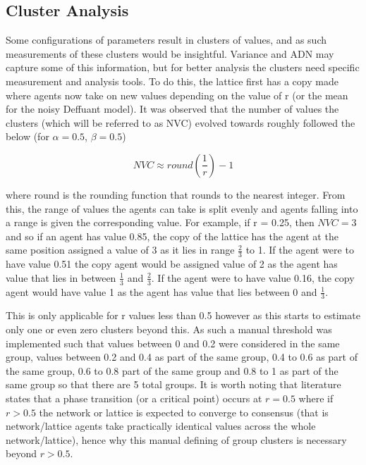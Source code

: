  \subsection{Cluster Analysis}
 Some configurations of parameters result in clusters of values, and as such measurements of these clusters would be insightful. Variance and ADN may capture some of this information, but for better analysis the clusters need specific measurement and analysis tools. To do this, the lattice first has a copy made where agents now take on new values depending on the value of r (or the mean for the noisy Deffuant model). It was observed that the number of values the clusters (which will be referred to as NVC) evolved towards roughly followed the below (for $\alpha = 0.5$, $\beta = 0.5$)

 \begin{equation}
 NVC \approx round(\frac{1}{r})-1
\end{equation}
 
 where round is the rounding function that rounds to the nearest integer. From this, the range of values the agents can take is split evenly and agents falling into a range is given the corresponding value. For example, if r = 0.25, then $NVC = 3$ and so if an agent has value 0.85, the copy of the lattice has the agent at the same position assigned a value of 3 as it lies in range $\frac{2}{3}$ to 1. If the agent were to have value 0.51 the copy agent would be assigned value of 2 as the agent has value that lies in between $\frac{1}{3}$ and $\frac{2}{3}$. If the agent were to have value 0.16, the copy agent would have value 1 as the agent has value that lies between 0 and $\frac{1}{3}$.

 This is only applicable for r values less than 0.5 however as this starts to estimate only one or even zero clusters beyond this. As such a manual threshold was implemented such that values between 0 and 0.2 were considered in the same group, values between 0.2 and 0.4 as part of the same group, 0.4 to 0.6 as part of the same group, 0.6 to 0.8 part of the same group and 0.8 to 1 as part of the same group so that there are 5 total groups. It is worth noting that literature states that a phase transition (or a critical point) occurs at $r=0.5$ \cite{FORTUNATO_2004} where if $r > 0.5$ the network or lattice is expected to converge to consensus (that is network/lattice agents take practically identical values across the whole network/lattice), hence why this manual defining of group clusters is necessary beyond $r>0.5$.